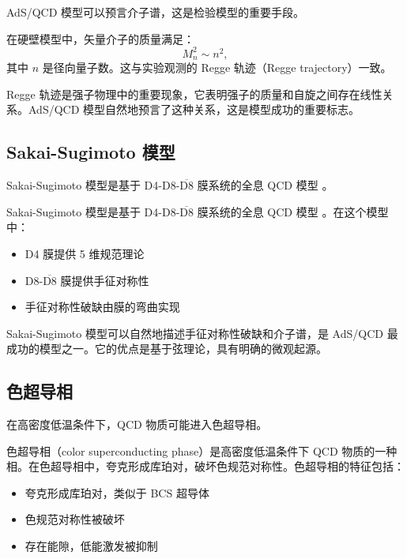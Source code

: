 AdS/QCD 模型可以预言介子谱，这是检验模型的重要手段。

\begin{proposition}[介子谱]
在硬壁模型中，矢量介子的质量满足：
\begin{equation}
    M_n^2 \sim n^2,
\end{equation}
其中 $n$ 是径向量子数。这与实验观测的 Regge 轨迹（Regge trajectory）一致。
\end{proposition}

\begin{remark}
Regge 轨迹是强子物理中的重要现象，它表明强子的质量和自旋之间存在线性关系。AdS/QCD 模型自然地预言了这种关系，这是模型成功的重要标志。
\end{remark}

\subsection{Sakai-Sugimoto 模型}

Sakai-Sugimoto 模型是基于 D4-D8-$\overline{\text{D8}}$ 膜系统的全息 QCD 模型 \cite{Sakai2004}。

\begin{definition}
Sakai-Sugimoto 模型是基于 D4-D8-$\overline{\text{D8}}$ 膜系统的全息 QCD 模型 \cite{Sakai2004}。在这个模型中：
\begin{itemize}
    \item D4 膜提供 5 维规范理论
    \item D8-$\overline{\text{D8}}$ 膜提供手征对称性
    \item 手征对称性破缺由膜的弯曲实现
\end{itemize}
\end{definition}

\begin{remark}
Sakai-Sugimoto 模型可以自然地描述手征对称性破缺和介子谱，是 AdS/QCD 最成功的模型之一。它的优点是基于弦理论，具有明确的微观起源。
\end{remark}

\subsection{色超导相}

在高密度低温条件下，QCD 物质可能进入色超导相。

\begin{definition}[色超导相]
色超导相（color superconducting phase）是高密度低温条件下 QCD 物质的一种相。在色超导相中，夸克形成库珀对，破坏色规范对称性。色超导相的特征包括：
\begin{itemize}
    \item 夸克形成库珀对，类似于 BCS 超导体
    \item 色规范对称性被破坏
    \item 存在能隙，低能激发被抑制
\end{itemize}
\end{definition}

